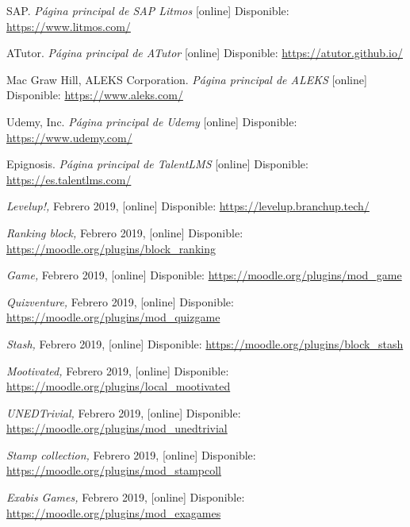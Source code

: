 \begin{thebibliography}{9}
    SAP. \textit{Página principal de SAP Litmos} [online] Disponible:
    \url{https://www.litmos.com/}

    ATutor. \textit{Página principal de ATutor} [online] Disponible:
    \url{https://atutor.github.io/}

    Mac Graw Hill, ALEKS Corporation. \textit{Página principal de ALEKS} [online] Disponible:    
    \url{https://www.aleks.com/}

    Udemy, Inc. \textit{Página principal de Udemy} [online]  Disponible:
    \url{https://www.udemy.com/}
 
    Epignosis. \textit{Página principal de TalentLMS} [online]  Disponible:
    \url{https://es.talentlms.com/}



        \textit{Levelup!,}
        Febrero 2019, [online] Disponible:  
        \url{https://levelup.branchup.tech/}
    
        \textit{Ranking block,}
        Febrero 2019, [online] Disponible:  
        \url{https://moodle.org/plugins/block_ranking}
    
        \textit{Game,}
        Febrero 2019, [online] Disponible:  
        \url{https://moodle.org/plugins/mod_game}
        
        \textit{Quizventure,}
        Febrero 2019, [online] Disponible:  
        \url{https://moodle.org/plugins/mod_quizgame}
        
        \textit{Stash,}
        Febrero 2019, [online] Disponible:  
        \url{https://moodle.org/plugins/block_stash}
    
        \textit{Mootivated,}
        Febrero 2019, [online] Disponible:  
        \url{https://moodle.org/plugins/local_mootivated}
    
        \textit{UNEDTrivial,}
        Febrero 2019, [online] Disponible:  
        \url{https://moodle.org/plugins/mod_unedtrivial}
    
        \textit{Stamp collection,}
        Febrero 2019, [online] Disponible:  
        \url{https://moodle.org/plugins/mod_stampcoll}
    
        \textit{Exabis Games,}
        Febrero 2019, [online] Disponible:  
        \url{https://moodle.org/plugins/mod_exagames}
    

\end{thebibliography}
